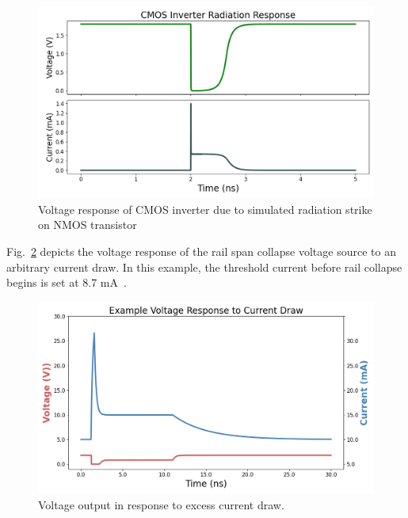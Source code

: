 \documentclass[conference]{IEEEtran}
\begin{document}
    \begin{figure}[htbp]
        \centering
        \includegraphics[width=0.95\linewidth]{Inverter_Response}
        \caption{Voltage response of CMOS inverter due to simulated radiation strike on NMOS transistor}
        \label{fig:inverter_response}
    \end{figure}


    Fig.~\ref{fig:rail_collapse_response} depicts the voltage response of the rail span collapse voltage source to an arbitrary current draw.
    In this example, the threshold current before rail collapse begins is set at 8.7 mA~\cite{Massengill1984}.

    \begin{figure}[htbp]
        \centering
        \includegraphics[width=0.95\linewidth]{Rail_Collapse_Response}
        \caption{Voltage output in response to excess current draw.}
        \label{fig:rail_collapse_response}
    \end{figure}


\end{document}
